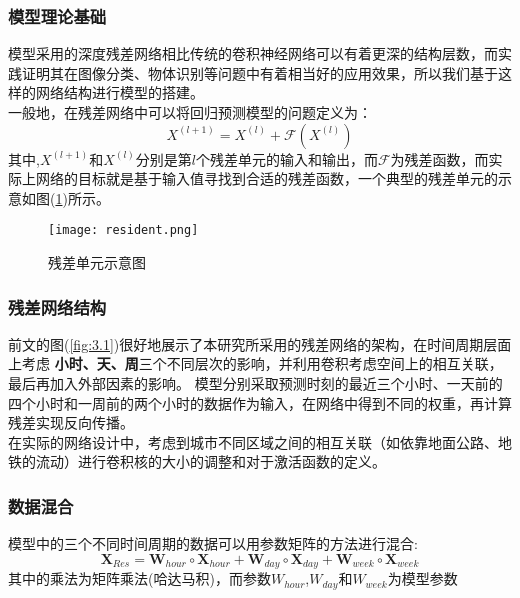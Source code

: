 \subsubsection*{模型理论基础}
模型采用的深度残差网络相比传统的卷积神经网络可以有着更深的结构层数\cite{he2016deep}，而实践证明其在图像分类、物体识别等问题中有着相当好的应用效果\cite{he2016identity}，所以我们基于这样的网络结构进行模型的搭建。\\
一般地，在残差网络中可以将回归预测模型的问题定义为：
\begin{equation}
X^{(l+1)} = X^{(l)} + \mathcal{F}(X^{(l)})
\end{equation}
其中,$X^{(l+1)}$和$X^{(l)}$分别是第$l$个残差单元的输入和输出，而$\mathcal{F}$为残差函数，而实际上网络的目标就是基于输入值寻找到合适的残差函数，一个典型的残差单元的示意如图(\ref{fig:resident})所示。
\begin{figure}[ht]
\centering
\texttt{[image: resident.png]}
\caption{残差单元示意图\cite{he2016deep}}
\label{fig:resident}
\end{figure}
\subsubsection*{残差网络结构}
前文的图(\ref{fig:3.1})很好地展示了本研究所采用的残差网络的架构，在时间周期层面上考虑 \textbf{小时、天、周}三个不同层次的影响，并利用卷积考虑空间上的相互关联，最后再加入外部因素的影响。 模型分别采取预测时刻的最近三个小时、一天前的四个小时和一周前的两个小时的数据作为输入，在网络中得到不同的权重，再计算残差实现反向传播。\\
\indent 在实际的网络设计中，考虑到城市不同区域之间的相互关联（如依靠地面公路、地铁的流动）进行卷积核的大小的调整和对于激活函数的定义。
\subsubsection*{数据混合}
模型中的三个不同时间周期的数据可以用参数矩阵的方法进行混合:
\begin{equation}
\mathbf { X } _ { R e s } = \mathbf { W } _ { hour } \circ \mathbf { X } _ { hour }  + \mathbf { W } _ {day } \circ \mathbf { X } _ { day }  + \mathbf { W } _ { week } \circ \mathbf { X } _ { week } 
\end{equation}
其中的乘法为矩阵乘法(哈达马积)，而参数$W_{hour}$,$W_{day}$和$W_{week}$为模型参数
